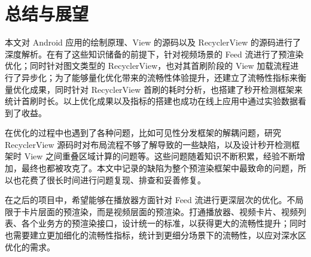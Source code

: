 \chapter{总结与展望}

本文对 Android 应用的绘制原理、View 的源码以及 RecyclerView 的源码进行了深度解析。在有了这些知识储备的前提下，针对视频场景的 Feed 流进行了预渲染优化；同时针对图文类型的 RecyclerView，也对其首刷阶段的 View 加载流程进行了异步化；为了能够量化优化带来的流畅性体验提升，还建立了流畅性指标来衡量优化成果，同时针对 RecyclerView 首刷的耗时分析，也搭建了秒开检测框架来统计首刷时长。以上优化成果以及指标的搭建也成功在线上应用中通过实验数据看到了收益。

在优化的过程中也遇到了各种问题，比如可见性分发框架的解耦问题，研究 RecyclerView 源码时对布局流程不够了解导致的一些缺陷，以及设计秒开检测框架时 View 之间重叠区域计算的问题等。这些问题随着知识不断积累，经验不断增加，最终也都被攻克了。本文中记录的缺陷为整个预渲染框架中最致命的问题，所以也花费了很长时间进行问题复现、排查和妥善修复。

在之后的项目中，希望能够在播放器方面针对 Feed 流进行更深层次的优化。不局限于卡片层面的预渲染，而是视频层面的预渲染。打通播放器、视频卡片、视频列表、各个业务方的预渲染接口，设计统一的标准，以获得更大的流畅性提升；同时也需要建立更加细化的流畅性指标，统计到更细分场景下的流畅性，以应对深水区优化的需求。